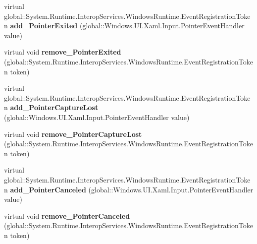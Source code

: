 \begin{DoxyCompactItemize}
\item 
\mbox{\label{class_windows_1_1_u_i_1_1_xaml_1_1_u_i_element_add2a4b911cb6783842ef779b81b58824}} 
virtual global\+::\+System.\+Runtime.\+Interop\+Services.\+Windows\+Runtime.\+Event\+Registration\+Token {\bfseries add\+\_\+\+Pointer\+Exited} (global\+::\+Windows.\+U\+I.\+Xaml.\+Input.\+Pointer\+Event\+Handler value)
\item 
\mbox{\label{class_windows_1_1_u_i_1_1_xaml_1_1_u_i_element_a0371add03a51f168e0d1456bdb3c1130}} 
virtual void {\bfseries remove\+\_\+\+Pointer\+Exited} (global\+::\+System.\+Runtime.\+Interop\+Services.\+Windows\+Runtime.\+Event\+Registration\+Token token)
\item 
\mbox{\label{class_windows_1_1_u_i_1_1_xaml_1_1_u_i_element_a66ebc4d8c8c99a7a0364051b341c48a6}} 
virtual global\+::\+System.\+Runtime.\+Interop\+Services.\+Windows\+Runtime.\+Event\+Registration\+Token {\bfseries add\+\_\+\+Pointer\+Capture\+Lost} (global\+::\+Windows.\+U\+I.\+Xaml.\+Input.\+Pointer\+Event\+Handler value)
\item 
\mbox{\label{class_windows_1_1_u_i_1_1_xaml_1_1_u_i_element_a4dc1dfa9d14ef2157a60a0da178c4784}} 
virtual void {\bfseries remove\+\_\+\+Pointer\+Capture\+Lost} (global\+::\+System.\+Runtime.\+Interop\+Services.\+Windows\+Runtime.\+Event\+Registration\+Token token)
\item 
\mbox{\label{class_windows_1_1_u_i_1_1_xaml_1_1_u_i_element_ae4cad3c4c84130d0d6362bc7aed7ba7d}} 
virtual global\+::\+System.\+Runtime.\+Interop\+Services.\+Windows\+Runtime.\+Event\+Registration\+Token {\bfseries add\+\_\+\+Pointer\+Canceled} (global\+::\+Windows.\+U\+I.\+Xaml.\+Input.\+Pointer\+Event\+Handler value)
\item 
\mbox{\label{class_windows_1_1_u_i_1_1_xaml_1_1_u_i_element_a2ce3ea526a5e9942687b9fe640cbdb26}} 
virtual void {\bfseries remove\+\_\+\+Pointer\+Canceled} (global\+::\+System.\+Runtime.\+Interop\+Services.\+Windows\+Runtime.\+Event\+Registration\+Token token)
\item 

\end{DoxyCompactItemize}
